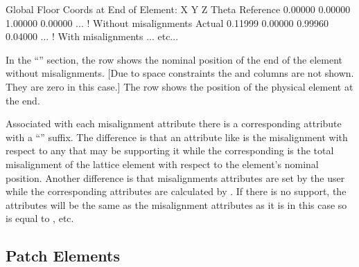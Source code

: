 \documentclass{hitec}     %
\begin{document}
{\begin{code}
Global Floor Coords at End of Element:
                X        Y        Z    Theta  
Reference  0.00000  0.00000  1.00000  0.00000 ... ! Without misalignments
Actual     0.11999  0.00000  0.99960  0.04000 ... ! With misalignments
... etc...
\end{code}

In the ``'' section, the  row shows the nominal position of
the  end of the element without misalignments. [Due to space constraints the  and
 columns are not shown. They are zero in this case.] The  row shows the position
of the physical element at the  end.

Associated with each misalignment attribute there is a corresponding attribute with a ``''
suffix. The difference is that an attribute like  is the misalignment with respect to
any  that may be supporting it while the corresponding
 is the total misalignment of the lattice element with respect to the element's
nominal position. Another difference is that misalignments attributes are set by the user while the
corresponding  attributes are calculated by \bmad. If there is no  support, the
 attributes will be the same as the misalignment attributes as it is in this case so
 is equal to , etc.

\subsection{Patch Elements}
\label{s:patch}

}
\end{document}
